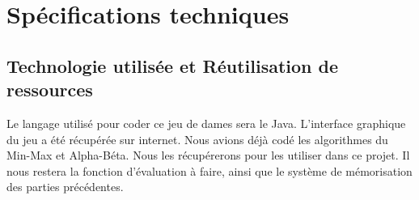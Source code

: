 \documentclass[a4paper, title page, 12pt]{report}
\begin{document}
	\chapter{Spécifications techniques}
	\section{Technologie utilisée et Réutilisation de ressources}
Le langage utilisé pour coder ce jeu de dames sera le Java. L'interface graphique du jeu a été récupérée sur internet. Nous avions déjà codé les algorithmes du Min-Max et Alpha-Béta. Nous les récupérerons pour les utiliser dans ce projet. Il nous restera la fonction d’évaluation à faire, ainsi que le système de mémorisation des parties précédentes.
\end{document}
